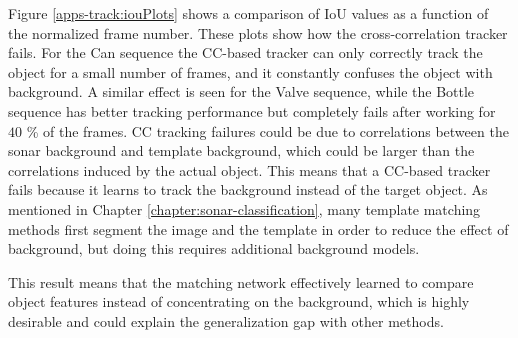 Figure \ref{apps-track:iouPlots} shows a comparison of IoU values as a function of the normalized frame number. These plots show how the cross-correlation tracker fails. For the Can sequence the CC-based tracker can only correctly track the object for a small number of frames, and it constantly confuses the object with background. A similar effect is seen for the Valve sequence, while the Bottle sequence has better tracking performance but completely fails after working for $40$ \% of the frames. CC tracking failures could be due to correlations between the sonar background and template background, which could be larger than the correlations induced by the actual object. This means that a CC-based tracker fails because it learns to track the background instead of the target object. As mentioned in Chapter \ref{chapter:sonar-classification}, many template matching methods first segment the image and the template in order to reduce the effect of background, but doing this requires additional background models.

This result means that the matching network effectively learned to compare object features instead of concentrating on the background, which is highly desirable and could explain the generalization gap with other methods.

